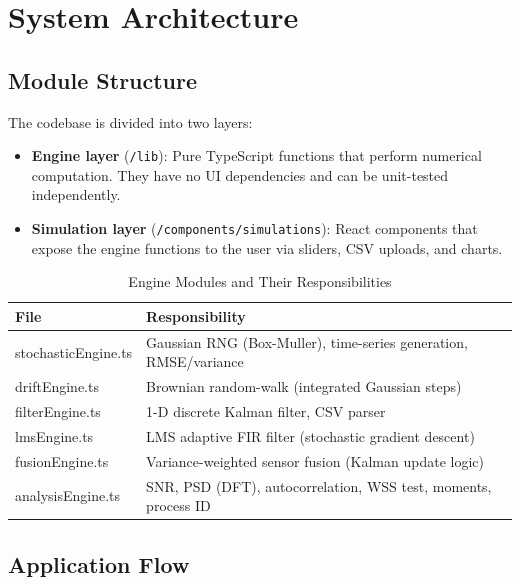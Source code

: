 \documentclass[12pt, a4paper]{article}
\begin{document}
\section{System Architecture}

\subsection{Module Structure}

The codebase is divided into two layers:

\begin{itemize}
  \item \textbf{Engine layer} (\texttt{/lib}): Pure TypeScript functions that perform
        numerical computation. They have no UI dependencies and can be unit-tested
        independently.
  \item \textbf{Simulation layer} (\texttt{/components/simulations}): React components
        that expose the engine functions to the user via sliders, CSV uploads, and charts.
\end{itemize}

\begin{table}[h!]
  \centering
  \caption{Engine Modules and Their Responsibilities}
  \begin{tabular}{>{\ttfamily}ll}
    \toprule
    \textbf{File} & \textbf{Responsibility} \\
    \midrule
    stochasticEngine.ts & Gaussian RNG (Box-Muller), time-series generation, RMSE/variance \\
    driftEngine.ts      & Brownian random-walk (integrated Gaussian steps) \\
    filterEngine.ts     & 1-D discrete Kalman filter, CSV parser \\
    lmsEngine.ts        & LMS adaptive FIR filter (stochastic gradient descent) \\
    fusionEngine.ts     & Variance-weighted sensor fusion (Kalman update logic) \\
    analysisEngine.ts   & SNR, PSD (DFT), autocorrelation, WSS test, moments, process ID \\
    \bottomrule
  \end{tabular}
\end{table}

\subsection{Application Flow}
\end{document}
